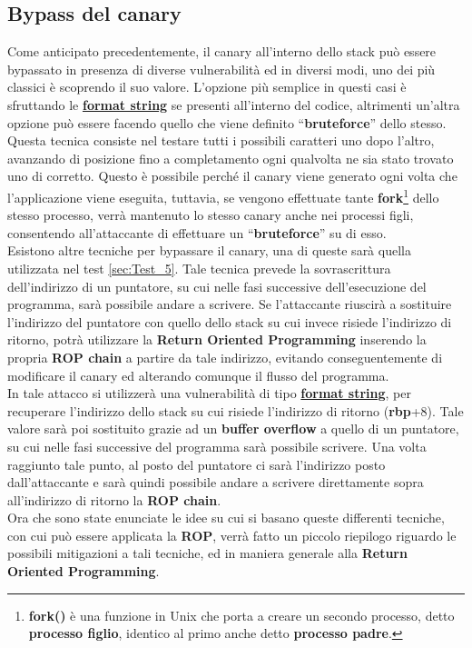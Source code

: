 \subsection*{Bypass del canary}
\label{sec:canary bypass}
Come anticipato precedentemente, il canary all'interno dello stack può essere bypassato in presenza di diverse vulnerabilità ed in diversi modi, uno dei più classici è scoprendo il suo valore. L'opzione più semplice in questi casi è sfruttando le \hyperref[subsec:format string]{\textbf{format string}} se presenti all'interno del codice, altrimenti un'altra opzione può essere facendo quello che viene definito ``\textbf{bruteforce}'' dello stesso. Questa tecnica consiste nel testare tutti i
possibili caratteri uno dopo l'altro, avanzando di posizione fino a completamento ogni qualvolta ne sia stato trovato uno di corretto. Questo è possibile perché il canary viene generato ogni volta che l'applicazione viene eseguita, tuttavia, se vengono effettuate tante \textbf{fork}\footnote[1]{\textbf{fork()} è una funzione in Unix che porta a creare un secondo processo, detto \textbf{processo figlio}, identico al primo anche detto \textbf{processo padre}.} dello stesso processo, verrà mantenuto 
lo stesso canary anche nei processi figli, consentendo all'attaccante di effettuare un ``\textbf{bruteforce}'' su di esso. \cite*{Canary-bypass-brute}\\
Esistono altre tecniche per bypassare il canary, una di queste sarà quella utilizzata nel test \ref{sec:Test_5}. Tale tecnica prevede la sovrascrittura dell'indirizzo di un puntatore, su cui nelle fasi successive dell'esecuzione del programma, sarà possibile andare a scrivere. Se l'attaccante riuscirà a sostituire l'indirizzo del puntatore con quello dello stack su cui invece risiede l'indirizzo di ritorno, potrà utilizzare la \textbf{Return Oriented Programming} inserendo la propria 
\textbf{ROP chain} a partire da tale indirizzo, evitando conseguentemente di modificare il canary ed alterando comunque il flusso del programma.\\
In tale attacco si utilizzerà una vulnerabilità di tipo \hyperref[subsec:format string]{\textbf{format string}}, per recuperare l'indirizzo dello stack su cui risiede l'indirizzo di ritorno (\textbf{rbp}+8). Tale valore sarà poi sostituito grazie ad un \textbf{buffer overflow} a quello di un puntatore, su cui nelle fasi successive del programma sarà possibile scrivere. Una volta raggiunto tale punto, al posto del puntatore ci sarà l'indirizzo posto dall'attaccante e sarà quindi possibile andare a scrivere
direttamente sopra all'indirizzo di ritorno la \textbf{ROP chain}.
\\
Ora che sono state enunciate le idee su cui si basano queste differenti tecniche, con cui può essere applicata la \textbf{ROP}, verrà fatto un piccolo riepilogo riguardo le possibili mitigazioni a tali tecniche, ed in maniera generale alla \textbf{Return Oriented Programming}.

